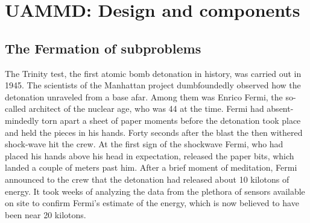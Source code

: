 \documentclass[twoside,openright,titlepage,numbers=noenddot,%
headinclude,footinclude,cleardoublepage=empty,abstract=on,
BCOR=5mm,fontsize=11pt, dvipsnames, paper=b5
]{scrreprt}
\begin{document}
\part{UAMMD: Design and components}\label{pt:uammd}

\chapter{The Fermation of subproblems}

The Trinity test, the first atomic bomb detonation in history, was carried out in 1945. The scientists of the Manhattan project dumbfoundedly observed how the detonation unraveled from a base afar. Among them was Enrico Fermi, the so-called architect of the nuclear age, who was 44 at the time. Fermi had absent-mindedly torn apart a sheet of paper moments before the detonation took place and held the pieces in his hands. Forty seconds after the blast the then withered shock-wave hit the crew. At the first sign of the shockwave Fermi, who had placed his hands above his head in expectation, released the paper bits, which landed a couple of meters past him. After a brief moment of meditation, Fermi announced to the crew that the detonation had released about 10 kilotons of energy.
It took weeks of analyzing the data from the plethora of sensors available on site to confirm Fermi's estimate of the energy, which is now believed to have been near 20 kilotons.
\end{document}
